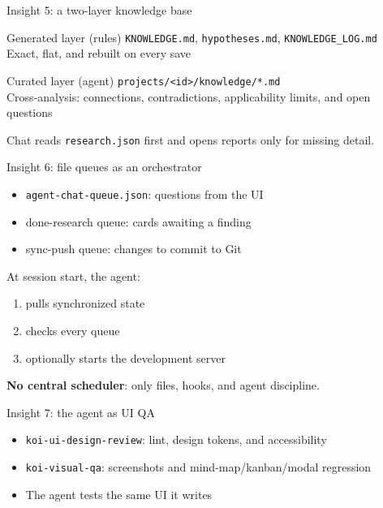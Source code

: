\documentclass[aspectratio=169,11pt]{beamer}
\begin{document}
\begin{frame}{Insight 5: a two-layer knowledge base}
  \begin{block}{Generated layer (rules)}
    \texttt{KNOWLEDGE.md}, \texttt{hypotheses.md}, \texttt{KNOWLEDGE\_LOG.md}\\
    Exact, flat, and rebuilt on every save
  \end{block}
  \begin{block}{Curated layer (agent)}
    \texttt{projects/<id>/knowledge/*.md}\\
    Cross-analysis: connections, contradictions, applicability limits, and open questions
  \end{block}
  \small Chat reads \texttt{research.json} first and opens reports only for missing detail.
\end{frame}

\begin{frame}{Insight 6: file queues as an orchestrator}
  \begin{itemize}
    \item \texttt{agent-chat-queue.json}: questions from the UI
    \item done-research queue: cards awaiting a finding
    \item sync-push queue: changes to commit to Git
  \end{itemize}
  \vspace{0.5em}
  At session start, the agent:
  \begin{enumerate}
    \item pulls synchronized state
    \item checks every queue
    \item optionally starts the development server
  \end{enumerate}
  \vspace{0.5em}
  \textbf{No central scheduler}: only files, hooks, and agent discipline.
\end{frame}

\begin{frame}{Insight 7: the agent as UI QA}
  \begin{itemize}
    \item \texttt{koi-ui-design-review}: lint, design tokens, and accessibility
    \item \texttt{koi-visual-qa}: screenshots and mind-map/kanban/modal regression
    \item The agent tests the same UI it writes
  \end{itemize}
\end{frame}
\end{document}
